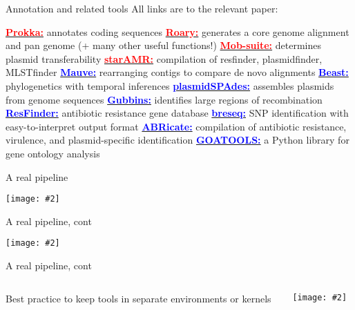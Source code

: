 \documentclass{beamer}
\renewcommand{\c}[1]{\begin{center}#1\end{center}}
\newcommand{\blu}[1]{\textcolor{blue}{\textbf{#1}}}
\newcommand{\red}[1]{\textcolor{red}{\textbf{#1}}}
\newcommand{\gr}[2][.95]{\c{\texttt{[image: \#2]}}}
\begin{document}
\begin{frame}{Annotation and related tools}
    \label{tools}
    \footnotesize
    All links are to the relevant paper:
    \begin{outline}
        \1 \href{https://academic.oup.com/bioinformatics/article/30/14/2068/2390517?login=true}{\red{Prokka:}} annotates coding sequences
        \1 \href{https://academic.oup.com/bioinformatics/article/31/22/3691/240757?login=true}{\red{Roary:}} generates a core genome alignment and pan genome (+ many other useful functions!)
        \1 \href{https://pubmed.ncbi.nlm.nih.gov/30052170/}{\red{Mob-suite:}} determines plasmid transferability
        \1 \href{https://www.mdpi.com/2076-2607/10/2/292}{\red{starAMR:}} compilation of resfinder, plasmidfinder, MLSTfinder
        \1 \href{https://www.ncbi.nlm.nih.gov/pmc/articles/PMC442156/}{\blu{Mauve:}} rearranging contigs to compare de novo alignments
        \1 \href{https://bmcecolevol.biomedcentral.com/articles/10.1186/1471-2148-7-214}{\blu{Beast:}} phylogenetics with temporal inferences
        \1 \href{https://academic.oup.com/bioinformatics/article/32/22/3380/2525610}{\blu{plasmidSPAdes:}} assembles plasmids from genome sequences
        \1 \href{https://academic.oup.com/nar/article/43/3/e15/2410982}{\blu{Gubbins:}} identifies large regions of recombination
        \1 \href{https://academic.oup.com/jac/article/75/12/3491/5890997}{\blu{ResFinder:}} antibiotic resistance gene database
        \1 \href{https://www.ncbi.nlm.nih.gov/pmc/articles/PMC4239701/}{\blu{breseq:}} SNP identification with easy-to-interpret output format
        \1 \href{https://github.com/tseemann/abricate}{\blu{ABRicate:}} compilation of antibiotic resistance, virulence, and plasmid-specific identification
        \1 \href{https://www.nature.com/articles/s41598-018-28948-z}{\blu{GOATOOLS:}} a Python library for gene ontology analysis
    \end{outline}
\end{frame}

\begin{frame}{A real pipeline}
    \gr[0.5]{l7_figs/s27_pipe1.png}
\end{frame}

\begin{frame}{A real pipeline, cont}
    \gr[0.5]{l7_figs/s28_pipe2.png}
\end{frame}

\begin{frame}{A real pipeline, cont}
    \begin{columns}
        \begin{column}{0.4\textwidth}
            Best practice to keep tools in separate environments or kernels
        \end{column}
        \begin{column}{0.6\textwidth}
            \gr[0.9]{l7_figs/s29_pipe3.png}
        \end{column}
    \end{columns}
\end{frame}
\end{document}

